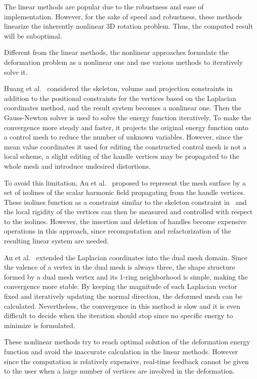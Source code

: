 The linear methods are popular due to the robustness  and ease of
implementation. However, for the sake of speed and robustness, these
methods linearize the inherently nonlinear 3D rotation problem.
Thus, the computed result will be suboptimal.

Different from the linear methods, the nonlinear  approaches
formulate the deformation problem as a nonlinear one and use various
methods to iteratively solve it.

Huang et al.~\cite{HSLZWTBGS06} considered the  skeleton, volume and
projection constraints in addition to the positional constraints for
the vertices based on the Laplacian coordinates method, and the
result system becomes a nonlinear one. Then the Gauss-Newton solver
is used to solve the energy function iteratively. To make the
convergence more steady and faster, it projects the original energy
function onto a control mesh to reduce the number of unknown
variables. However, since the mean value coordinates it used for
editing the constructed control mesh is not a local scheme, a slight
editing of the handle vertices may be propagated to the whole mesh
and introduce undesired distortions.

To avoid this limitation, Au et al.~\cite{AFTC07}  proposed to
represent the mesh surface by a set of isolines of the scalar
harmonic field propagating from the handle vertices. These isolines
function as a constraint similar to the skeleton constraint
in~\cite{HSLZWTBGS06} and the local rigidity of the vertices can
then be measured and controlled with respect to the isolines.
However, the insertion and deletion of handles become expensive
operations in this approach, since recomputation and refactorization
of the resulting linear system are needed.

Au et al.~\cite{ATLF06} extended the Laplacian  coordinates into the
dual mesh domain. Since the valence of a vertex in the dual mesh is
always three, the shape structure formed by a dual mesh vertex and
its 1-ring neighborhood is simple, making the convergence more
stable. By keeping the magnitude of each Laplacian vector fixed and
iteratively updating the normal direction, the deformed mesh can be
calculated. Nevertheless, the convergence in this method is slow and
it is even difficult to decide when the iteration should stop since
no specific energy to minimize is formulated.

These nonlinear  methods try to reach optimal solution of the
deformation energy function and avoid the inaccurate calculation in
the linear methods. However since the computation is relatively
expensive, real-time feedback cannot be given to the user when a
large number of vertices are involved in the deformation.

